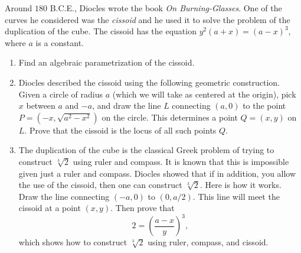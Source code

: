 \begin{exercise}{10}
    Around $180$ B.C.E., Diocles wrote the book \emph{On Burning-Glasses}. One of the curves he considered was the \emph{cissoid} and he used it to solve the problem of the duplication of the cube. The cissoid has the equation $y^2 (a+x) = (a-x)^3$, where $a$ is a constant. 
    \begin{enumerate}
        \item Find an algebraic parametrization of the cissoid.
        \item Diocles described the cissoid using the following geometric construction. Given a circle of radius $a$ (which we will take as centered at the origin), pick $x$ between $a$ and $-a$, and draw the line $L$ connecting $(a,0)$ to the point $P = (-x,\sqrt{a^2 - x^2})$ on the circle. This determines a point $Q = (x,y)$ on $L$. Prove that the cissoid is the locus of all such points $Q$.
         \item The duplication of the cube is the classical Greek problem of trying to construct $\sqrt[3]{2}$ using ruler and compass. It is known that this is impossible given just a ruler and compass. Diocles showed that if in addition, you allow the use of the cissoid, then one can construct $\sqrt[3]{2}$. Here is how it works. Draw the line connecting $(-a,0)$ to $(0,a/2)$. This line will meet the cissoid at a point $(x,y)$. Then prove that
         $$2 = \left(\frac{a-x}{y}\right)^3,$$
         which shows how to construct $\sqrt[3]{2}$ using ruler, compass, and cissoid.
    \end{enumerate}
\end{exercise}
